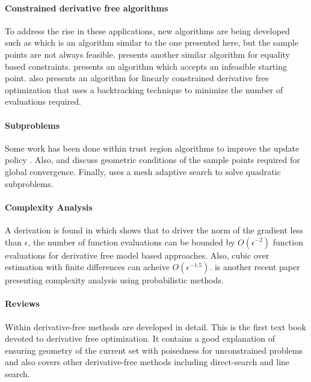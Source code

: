 \paragraph{Constrained derivative free algorithms}
To address the rise in these applications, new algorithms are being developed such as \cite{doi:10.1080/10556788.2015.1026968} which is an algorithm similar to the one presented here, but the sample points are not always feasible.
\cite{Tröltzsch2016} presents another similar algorithm for equality based constraints.
\cite{infeasiblestarting} presents an algorithm which accepts an infeasible starting point.
\cite{Gao2018} also presents an algorithm for linearly constrained derivative free optimization that uses a backtracking technique to minimize the number of evaluations required.

\paragraph{Subproblems}
Some work has been done within trust region algorithms to improve the update policy \cite{Kamandi2017}.
Also, \cite{Verdério2017} and \cite{doi:10.1080/10556780802409296} discuss geometric conditions of the sample points required for global convergence.
Finally, \cite{AMAIOUA201813} uses a mesh adaptive search to solve quadratic subproblems.


\paragraph{Complexity Analysis}

A derivation is found in \cite{doi:10.1137/151005683} which shows that to driver the norm of the gradient less than $\epsilon$, the number of function evaluations can be bounded by $O(\epsilon^{-2})$ 
function evaluations for derivative free model based approaches. Also, cubic over estimation with finite differences can acheive $O(\epsilon^{-1.5})$. \cite{doi:10.1093/imanum/drx043} is another recent paper presenting complexity analysis using probabilistic methods.


\paragraph{Reviews}
Within \cite{DUMMY:intro_book} derivative-free methods are developed in detail.
This is the first text book devoted to derivative free optimization.
It contains a good explanation of ensuring geometry of the current set with poisedness for unconstrained problems and also covers other derivative-free methods including direct-search and line search.

